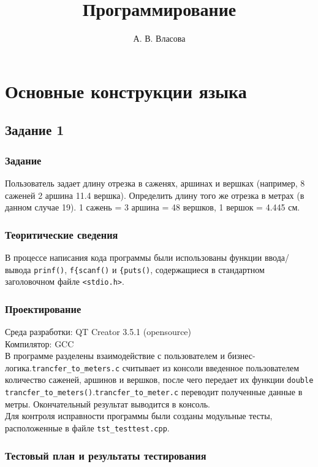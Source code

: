 \documentclass[12pt,a4paper]{report}
\begin{document}
\title{Программирование}
\author{А. В. Власова}
\maketitle
\chapter{Основные конструкции языка}
\section{Задание 1}
\subsection{Задание}
Пользователь задает длину отрезка в саженях, аршинах и вершках (например, 8 саженей 2 аршина 11.4 вершка). Определить длину того же отрезка в метрах (в данном случае 19). 1 сажень = 3 аршина = 48 вершков, 1 вершок = 4.445 см.
\subsection{Теоритические сведения}

В процессе написания кода программы были использованы функции ввода/вывода \verb+prinf()+, \verb+f{scanf()+  и \verb+{puts()+, содержащиеся в стандартном заголовочном файле \verb+<stdio.h>+. 


\subsection{Проектирование}

Среда разработки: QT Creator 3.5.1 (opensource)
\\
Компилятор: GCC
\\
В программе разделены взаимодействие с пользователем и бизнес-логика.\verb+trancfer_to_meters.c+  считывает из консоли введенное пользователем количество саженей, аршинов и вершков, после чего передает их функции \verb+double trancfer_to_meters()+.\verb+trancfer_to_meter.c+ переводит полученные данные в метры. Окончательный результат выводится в консоль.
\\
Для контроля исправности программы были созданы модульные тесты, расположенные в файле \verb+tst_testtest.cpp+.

\subsection{Тестовый план и результаты тестирования}
\end{document}
